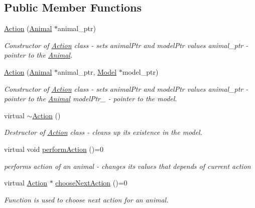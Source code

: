 \subsection*{Public Member Functions}
\begin{DoxyCompactItemize}
\item 
\hyperlink{class_action_abcd25a36fbb4261eb65221e4bccb8b0d}{Action} (\hyperlink{class_animal}{Animal} $\ast$animal\+\_\+ptr)
\begin{DoxyCompactList}\small\item\em Constructor of \hyperlink{class_action}{Action} class -\/ sets animal\+Ptr and model\+Ptr values  animal\+\_\+ptr -\/ pointer to the \hyperlink{class_animal}{Animal}. \end{DoxyCompactList}\item 
\hyperlink{class_action_a5deee4e1c042e7a6fe9962a6815a5dc4}{Action} (\hyperlink{class_animal}{Animal} $\ast$animal\+\_\+ptr, \hyperlink{class_model}{Model} $\ast$model\+\_\+ptr)
\begin{DoxyCompactList}\small\item\em Constructor of \hyperlink{class_action}{Action} class -\/ sets animal\+Ptr and model\+Ptr values  animal\+\_\+ptr -\/ pointer to the \hyperlink{class_animal}{Animal}  model\+Ptr\+\_\+ -\/ pointer to the model. \end{DoxyCompactList}\item 
virtual \hyperlink{class_action_acdb06775d157339256a8ecd55749226c}{$\sim$\+Action} ()
\begin{DoxyCompactList}\small\item\em Destructor of \hyperlink{class_action}{Action} class -\/ cleans up it\textquotesingle{}s existence in the model. \end{DoxyCompactList}\item 
virtual void \hyperlink{class_action_a3c85e74092f2c31f4b8a4aa4df88d2d8}{perform\+Action} ()=0
\begin{DoxyCompactList}\small\item\em performs action of an animal -\/ changes it\textquotesingle{}s values that depends of current action \end{DoxyCompactList}\item 
virtual \hyperlink{class_action}{Action} $\ast$ \hyperlink{class_action_a53d4d2522e3dd256e8b6eb1fe5887649}{choose\+Next\+Action} ()=0
\begin{DoxyCompactList}\small\item\em Function is used to choose next action for an animal. \end{DoxyCompactList}\item 

\end{DoxyCompactItemize}
